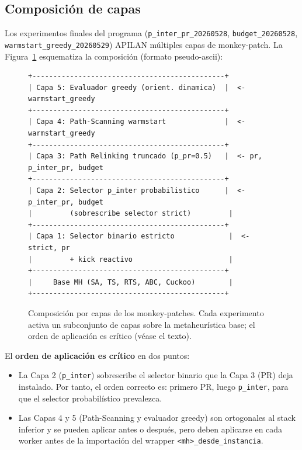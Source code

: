\documentclass[11pt,a4paper]{article}
\theoremstyle{definition}
\theoremstyle{remark}
\begin{document}
\subsection{Composición de capas}

Los experimentos finales del programa (\texttt{p\_inter\_pr\_20260528},
\texttt{budget\_20260528}, \texttt{warmstart\_greedy\_20260529}) APILAN
múltiples capas de monkey-patch. La Figura~\ref{fig:capas} esquematiza
la composición (formato pseudo-ascii):

\begin{figure}[h]
\centering
\begin{verbatim}
+----------------------------------------------+
| Capa 5: Evaluador greedy (orient. dinamica)  |  <- warmstart_greedy
+----------------------------------------------+
| Capa 4: Path-Scanning warmstart              |  <- warmstart_greedy
+----------------------------------------------+
| Capa 3: Path Relinking truncado (p_pr=0.5)   |  <- pr, p_inter_pr, budget
+----------------------------------------------+
| Capa 2: Selector p_inter probabilistico      |  <- p_inter_pr, budget
|         (sobrescribe selector strict)         |
+----------------------------------------------+
| Capa 1: Selector binario estricto             |  <- strict, pr
|         + kick reactivo                       |
+----------------------------------------------+
|     Base MH (SA, TS, RTS, ABC, Cuckoo)        |
+----------------------------------------------+
\end{verbatim}
\caption{Composición por capas de los monkey-patches. Cada experimento
         activa un subconjunto de capas sobre la metaheurística base; el
         orden de aplicación es crítico (véase el texto).}
\label{fig:capas}
\end{figure}

El \textbf{orden de aplicación es crítico} en dos puntos:

\begin{itemize}
\item La Capa 2 (\texttt{p\_inter}) sobrescribe el selector binario
  que la Capa 3 (PR) deja instalado. Por tanto, el orden correcto es:
  primero PR, luego \texttt{p\_inter}, para que el selector
  probabilístico prevalezca.
\item Las Capas 4 y 5 (Path-Scanning y evaluador greedy) son
  ortogonales al stack inferior y se pueden aplicar antes o después,
  pero deben aplicarse en cada worker antes de la importación del
  wrapper \texttt{<mh>\_desde\_instancia}.
\end{itemize}
\end{document}
